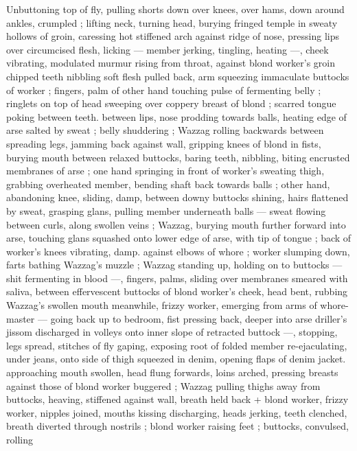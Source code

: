 Unbuttoning top of fly, pulling shorts down over knees, over hams, 
down around ankles, crumpled ; lifting neck, turning head, burying 
fringed temple in sweaty hollows of groin, caressing hot stiffened 
arch against ridge of nose, pressing lips over circumcised flesh, 
licking --- member jerking, tingling, heating ---, cheek vibrating, 
modulated murmur rising from throat, against blond worker's groin 
chipped teeth nibbling soft flesh pulled back, arm squeezing 
immaculate buttocks of worker ; fingers, palm of other hand touching 
pulse of fermenting belly ; ringlets on top of head sweeping over 
coppery breast of blond ; scarred tongue poking between teeth. 
between lips, nose prodding towards balls, heating edge of arse 
salted by sweat ; belly shuddering ; Wazzag rolling backwards 
between spreading legs, jamming back against wall, gripping knees 
of blond in fists, burying mouth between relaxed buttocks, baring 
teeth, nibbling, biting encrusted membranes of arse ; one hand 
springing in front of worker's sweating thigh, grabbing overheated 
member, bending shaft back towards balls ; other hand, abandoning 
knee, sliding, damp, between downy buttocks shining, hairs flattened 
by sweat, grasping glans, pulling member underneath balls --- sweat 
flowing between curls, along swollen veins ; Wazzag, burying mouth 
further forward into arse, touching glans squashed onto lower edge 
of arse, with tip of tongue ; back of worker's knees vibrating, damp. 
against elbows of whore ; worker slumping down, farts bathing 
Wazzag's muzzle ; Wazzag standing up, holding on to buttocks --- 
shit fermenting in blood ---, fingers, palms, sliding over membranes 
smeared with saliva, between effervescent buttocks of blond 
worker's cheek, head bent, rubbing Wazzag's swollen mouth 
meanwhile, frizzy worker, emerging from arms of whore-master --- 
going back up to bedroom, fist pressing back, deeper into arse 
driller's jissom discharged in volleys onto inner slope of retracted 
buttock ---, stopping, legs spread, stitches of fly gaping, exposing 
root of folded member re-ejaculating, under jeans, onto side of thigh 
squeezed in denim, opening flaps of denim jacket. approaching 
mouth swollen, head flung forwards, loins arched, pressing breasts 
against those of blond worker buggered ; Wazzag pulling thighs 
away from buttocks, heaving, stiffened against wall, breath held back 
+ blond worker, frizzy worker, nipples joined, mouths kissing 
discharging, heads jerking, teeth clenched, breath diverted through 
nostrils ; blond worker raising feet ; buttocks, convulsed, rolling 
